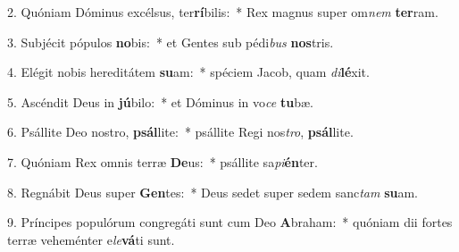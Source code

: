 2. Quóniam Dóminus excélsus, ter\textbf{rí}bilis:~*  Rex magnus super om\textit{nem} \textbf{ter}ram.\

3. Subjécit pópulos \textbf{no}bis:~*  et Gentes sub pédi\textit{bus} \textbf{nos}tris.\

4. Elégit nobis hereditátem \textbf{su}am:~*  spéciem Jacob, quam \textit{di}\textbf{lé}xit.\

5. Ascéndit Deus in \textbf{jú}bilo:~*  et Dóminus in vo\textit{ce} \textbf{tu}bæ.\

6. Psállite Deo nostro, \textbf{psál}lite:~*  psállite Regi nos\textit{tro}, \textbf{psál}lite.\

7. Quóniam Rex omnis terræ \textbf{De}us:~*  psállite sa\textit{pi}\textbf{én}ter.\

8. Regnábit Deus super \textbf{Gen}tes:~*  Deus sedet super sedem sanc\textit{tam} \textbf{su}am.\

9. Príncipes populórum congregáti sunt cum Deo \textbf{A}braham:~*  quóniam dii fortes terræ veheménter e\textit{le}\textbf{vá}ti sunt.\

